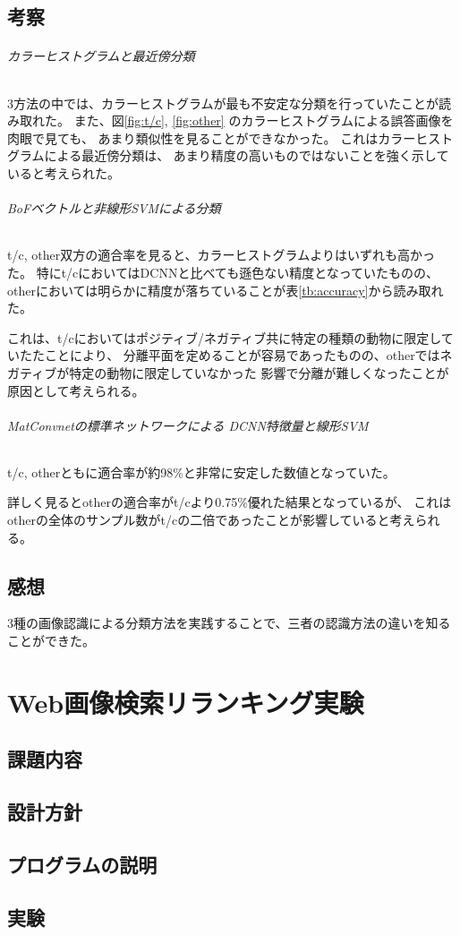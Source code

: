 \documentclass[11pt,a4paper, uplatex]{jsreport}
\begin{document}
\section{考察}
\subparagraph{カラーヒストグラムと最近傍分類}
3方法の中では、カラーヒストグラムが最も不安定な分類を行っていたことが読み取れた。
また、図\ref{fig:t/c}, \ref{fig:other}
のカラーヒストグラムによる誤答画像を肉眼で見ても、
あまり類似性を見ることができなかった。
これはカラーヒストグラムによる最近傍分類は、
あまり精度の高いものではないことを強く示していると考えられた。

\subparagraph{BoFベクトルと非線形SVMによる分類}
t/c, other双方の適合率を見ると、カラーヒストグラムよりはいずれも高かった。
特にt/cにおいてはDCNNと比べても遜色ない精度となっていたものの、
otherにおいては明らかに精度が落ちていることが表\ref{tb:accuracy}から読み取れた。

これは、t/cにおいてはポジティブ/ネガティブ共に特定の種類の動物に限定していたたことにより、
分離平面を定めることが容易であったものの、otherではネガティブが特定の動物に限定していなかった
影響で分離が難しくなったことが原因として考えられる。

\subparagraph{MatConvnetの標準ネットワークによる DCNN特徴量と線形SVM}
t/c, otherともに適合率が約98\%と非常に安定した数値となっていた。

詳しく見るとotherの適合率がt/cより0.75\%優れた結果となっているが、
これはotherの全体のサンプル数がt/cの二倍であったことが影響していると考えられる。
\section{感想}
3種の画像認識による分類方法を実践することで、三者の認識方法の違いを知ることができた。
\chapter{Web画像検索リランキング実験}
\section{課題内容}
\section{設計方針}
\section{プログラムの説明}
\section{実験}
\end{document}
